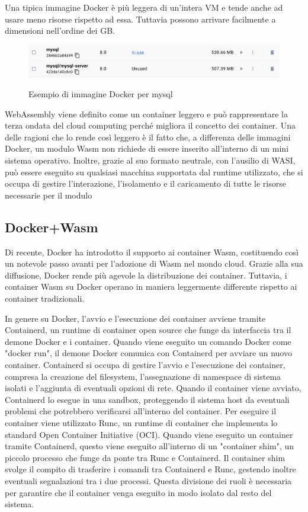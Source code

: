 Una tipica immagine Docker è più leggera di un'intera VM e tende anche ad usare meno risorse rispetto ad essa. Tuttavia
possono arrivare facilmente a dimensioni nell'ordine dei GB.

\begin{figure}[h]
    \centering
    \captionsetup{justification=centering}
    \includegraphics[width=15cm]{./chapters/2.wasi-in-depth/images/8.docker-images-size.png}
    \label{mysql_docker_image}
    \caption{Esempio di immagine Docker per mysql}
\end{figure}

WebAssembly viene definito come un container leggero e può rappresentare la terza ondata del cloud computing perché
migliora il concetto dei container. Una delle ragioni che lo rende così leggero è il fatto che, a differenza delle
immagini Docker, un modulo Wasm non richiede di essere inserito all'interno di un mini sistema operativo. Inoltre,
grazie al suo formato neutrale, con l'ausilio di WASI, può essere eseguito su qualsiasi macchina supportata dal runtime
utilizzato, che si occupa di gestire l'interazione, l'isolamento e il caricamento di tutte le risorse necessarie per il
modulo

\subsection{Docker+Wasm}
Di recente, Docker ha introdotto il supporto ai container Wasm\cite{docker-wasm-tech-preview}, costituendo così un
notevole passo avanti per l'adozione di Wasm nel mondo cloud. Grazie alla sua diffusione, Docker rende più agevole la
distribuzione dei container. Tuttavia, i container Wasm su Docker operano in maniera leggermente differente rispetto ai
container tradizionali.

In genere su Docker, l'avvio e l'esecuzione dei container avviene tramite Containerd, un runtime di container open
source che funge da interfaccia tra il demone Docker e i container. Quando viene eseguito un comando Docker come "docker
run", il demone Docker comunica con Containerd per avviare un nuovo container. Containerd si occupa di gestire l'avvio e
l'esecuzione dei container, compresa la creazione del filesystem, l'assegnazione di namespace di sistema isolati e
l'aggiunta di eventuali opzioni di rete. Quando il container viene avviato, Containerd lo esegue in una sandbox,
proteggendo il sistema host da eventuali problemi che potrebbero verificarsi all'interno del container. Per eseguire il
container viene utilizzato Runc, un runtime di container che implementa lo standard Open Container Initiative (OCI).
Quando viene eseguito un container tramite Containerd, questo viene eseguito all'interno di un "container shim", un
piccolo processo che funge da ponte tra Runc e Containerd. Il container shim svolge il compito di trasferire i comandi
tra Containerd e Runc, gestendo inoltre eventuali segnalazioni tra i due processi. Questa divisione dei ruoli è
necessaria per garantire che il container venga eseguito in modo isolato dal resto del sistema.

